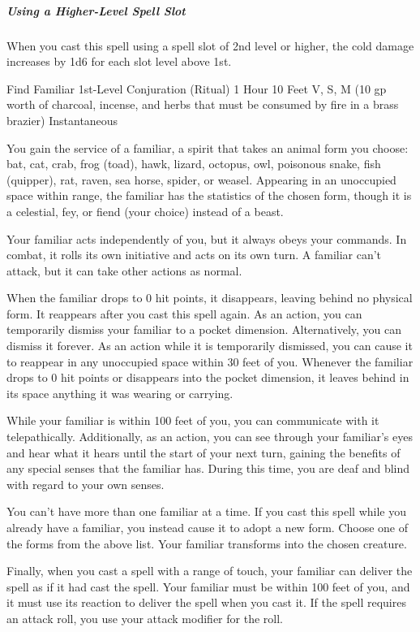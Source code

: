 \documentclass[letterpaper,openany,oneside,twocolumn]{book}
\begin{document}
\subparagraph*{Using a Higher-Level Spell Slot} When you cast this spell using a spell slot of 2nd level or higher, the cold damage increases by 1d6 for each slot level above 1st.

\DndSpellHeader
  {Find Familiar}
  {1st-Level Conjuration (Ritual)}
  {1 Hour}
  {10 Feet}
  {V, S, M (10 gp worth of charcoal, incense, and herbs that must be consumed by fire in a brass brazier)}
  {Instantaneous}

You gain the service of a familiar, a spirit that takes an animal form you choose: bat, cat, crab, frog (toad), hawk, lizard, octopus, owl, poisonous snake, fish (quipper), rat, raven, sea horse, spider, or weasel. Appearing in an unoccupied space within range, the familiar has the statistics of the chosen form, though it is a celestial, fey, or fiend (your choice) instead of a beast.

Your familiar acts independently of you, but it always obeys your commands. In combat, it rolls its own initiative and acts on its own turn. A familiar can't attack, but it can take other actions as normal.

When the familiar drops to 0 hit points, it disappears, leaving behind no physical form. It reappears after you cast this spell again. As an action, you can temporarily dismiss your familiar to a pocket dimension. Alternatively, you can dismiss it forever. As an action while it is temporarily dismissed, you can cause it to reappear in any unoccupied space within 30 feet of you. Whenever the familiar drops to 0 hit points or disappears into the pocket dimension, it leaves behind in its space anything it was wearing or carrying.

While your familiar is within 100 feet of you, you can communicate with it telepathically. Additionally, as an action, you can see through your familiar's eyes and hear what it hears until the start of your next turn, gaining the benefits of any special senses that the familiar has. During this time, you are deaf and blind with regard to your own senses.

You can't have more than one familiar at a time. If you cast this spell while you already have a familiar, you instead cause it to adopt a new form. Choose one of the forms from the above list. Your familiar transforms into the chosen creature.

Finally, when you cast a spell with a range of touch, your familiar can deliver the spell as if it had cast the spell. Your familiar must be within 100 feet of you, and it must use its reaction to deliver the spell when you cast it. If the spell requires an attack roll, you use your attack modifier for the roll.
\end{document}
